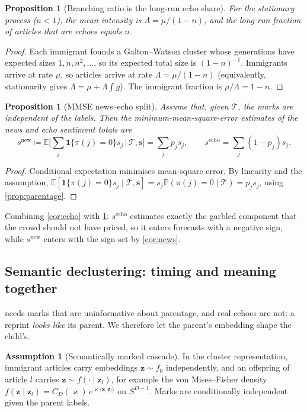 \documentclass[11pt,a4paper]{article}
\theoremstyle{plain}
\newtheorem{proposition}[theorem]{Proposition}
\theoremstyle{definition}
\newtheorem{assumption}[theorem]{Assumption}
\theoremstyle{remark}
\newcommand{\E}{\mathbb{E}}
\newcommand{\Prob}{\mathbb{P}}
\newcommand{\z}{\bm{z}}
\newcommand{\ind}{\mathbf{1}}
\begin{document}
\begin{proposition}[Branching ratio is the long-run echo share]\label{prop:branching}
For the stationary process ($n<1$), the mean intensity is $\Lambda=\mu/(1-n)$, and the long-run fraction of articles that are echoes equals $n$.
\end{proposition}
\begin{proof}
Each immigrant founds a Galton--Watson cluster whose generations have expected sizes $1,n,n^2,\dots$, so its expected total size is $(1-n)^{-1}$. Immigrants arrive at rate $\mu$, so articles arrive at rate $\Lambda=\mu/(1-n)$ (equivalently, stationarity gives $\Lambda=\mu+\Lambda\int g$). The immigrant fraction is $\mu/\Lambda=1-n$.
\end{proof}

\begin{proposition}[MMSE news--echo split]\label{prop:mmse}
Assume that, given $\mathcal{T}$, the marks are independent of the labels. Then the minimum-mean-square-error estimates of the news and echo sentiment totals are
\[
  s^{\text{new}}\coloneqq\E\Big[\sum_j\ind\{\pi(j)=0\}s_j\,\Big|\,\mathcal{T},\bm s\Big]=\sum_j p_j s_j,\qquad
  s^{\text{echo}}=\sum_j(1-p_j)s_j .
\]
\end{proposition}
\begin{proof}
Conditional expectation minimises mean-square error. By linearity and the assumption, $\E[\ind\{\pi(j)=0\}s_j\mid\mathcal{T},\bm s]=s_j\Prob(\pi(j)=0\mid\mathcal{T})=p_js_j$, using \cref{prop:parentage}.
\end{proof}

\begin{intuition}
Combining \cref{cor:echo} with \cref{prop:mmse}: $s^{\text{echo}}$ estimates exactly the garbled component that the crowd should not have priced, so it enters forecasts with a negative sign, while $s^{\text{new}}$ enters with the sign set by \cref{cor:news}.
\end{intuition}


\subsection{Semantic declustering: timing and meaning together}\label{sec:semantic}

 needs marks that are uninformative about parentage, and real echoes are not: a reprint \emph{looks like} its parent. We therefore let the parent's embedding shape the child's.

\begin{assumption}[Semantically marked cascade]\label{ass:marked}
In the cluster representation, immigrant articles carry embeddings $\z\sim f_0$ independently, and an offspring of article $l$ carries $\z\sim f(\cdot\mid\z_l)$, for example the von Mises--Fisher density $f(\z\mid\z_l)=C_D(\varkappa)\,e^{\varkappa\langle\z,\z_l\rangle}$ on $S^{D-1}$. Marks are conditionally independent given the parent labels.
\end{assumption}
\end{document}
